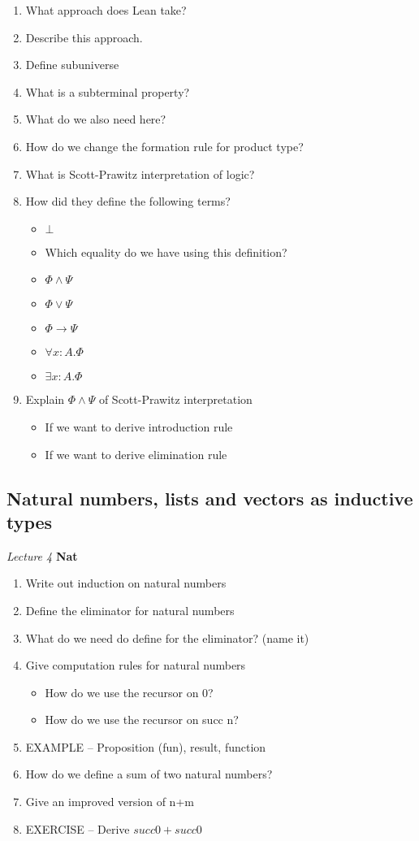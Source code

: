 \documentclass[fleqn]{article}
\begin{document}
\begin{enumerate}
    \item What approach does Lean take?
    \item Describe this approach.
    \item Define subuniverse
    \item What is a subterminal property?
    \item What do we also need here?
    \item How do we change the formation rule for product type?
    \item What is Scott-Prawitz interpretation of logic?
    \item How did they define the following terms?
    \begin{itemize}
        \item $\bot$
        \item Which equality do we have using this definition?
        \item $\Phi \wedge \Psi$
        \item $\Phi \vee \Psi$
        \item $\Phi \rightarrow \Psi$
        \item $\forall x : A. \Phi$
        \item $\exists x: A. \Phi$
    \end{itemize}
    \item Explain $\Phi \wedge \Psi$ of Scott-Prawitz interpretation
    \begin{itemize}
        \item If we want to derive introduction rule
        \item If we want to derive elimination rule 
    \end{itemize}    
\end{enumerate}

\subsection{Natural numbers, lists and vectors as inductive types}
\textit{Lecture 4}
\textbf{Nat}
\begin{enumerate}
    \item Write out induction on natural numbers
    \item Define the eliminator for natural numbers
    \item What do we need do define for the eliminator? (name it)
    \item Give computation rules for natural numbers
    \begin{itemize}
        \item How do we use the recursor on 0?
        \item How do we use the recursor on succ n?   
    \end{itemize}
    \item EXAMPLE -- Proposition (fun), result, function
    \item How do we define a sum of two natural numbers?
    \item Give an improved version of n+m
    \item EXERCISE -- Derive $succ 0 + succ 0$
\end{enumerate}
\end{document}
